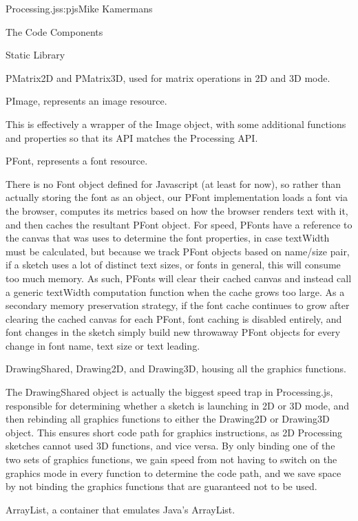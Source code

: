 \begin{aosachapter}{Processing.js}{s:pjs}{Mike Kamermans}
\begin{aosasect1}{The Code Components}
\begin{aosasect2}{Static Library}
\begin{aosaitemize}
\item PMatrix2D and PMatrix3D, used for matrix operations in 2D and 3D
  mode.

\item PImage, represents an image resource.

This is effectively a wrapper of the Image object, with some
additional functions and properties so that its API matches the
Processing API.

\item PFont, represents a font resource.

There is no Font object defined for Javascript (at least for now), so
rather than actually storing the font as an object, our PFont
implementation loads a font via the browser, computes its metrics
based on how the browser renders text with it, and then caches the
resultant PFont object. For speed, PFonts have a reference to the
canvas that was uses to determine the font properties, in case
textWidth must be calculated, but because we track PFont objects based
on name/size pair, if a sketch uses a lot of distinct text sizes, or
fonts in general, this will consume too much memory. As such, PFonts
will clear their cached canvas and instead call a generic textWidth
computation function when the cache grows too large. As a secondary
memory preservation strategy, if the font cache continues to grow
after clearing the cached canvas for each PFont, font caching is
disabled entirely, and font changes in the sketch simply build new
throwaway PFont objects for every change in font name, text size or
text leading.

\item DrawingShared, Drawing2D, and Drawing3D, housing all the
  graphics functions.

The DrawingShared object is actually the biggest speed trap in
Processing.js, responsible for determining whether a sketch is
launching in 2D or 3D mode, and then rebinding all graphics functions
to either the Drawing2D or Drawing3D object. This ensures short code
path for graphics instructions, as 2D Processing sketches cannot used
3D functions, and vice versa. By only binding one of the two sets of
graphics functions, we gain speed from not having to switch on the
graphics mode in every function to determine the code path, and we
save space by not binding the graphics functions that are guaranteed
not to be used.

\item ArrayList, a container that emulates Java's ArrayList.


\end{aosaitemize}
\end{aosasect2}
\end{aosasect1}
\end{aosachapter}

